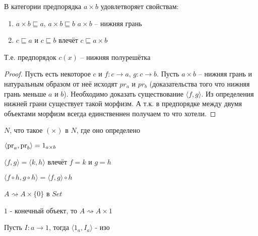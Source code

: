 \begin{task}
  В категории предпорядка
  $a \times b$ удовлетворяет свойствам:
  \begin{enumerate}
  \item $a \times b \sqsubseteq a$, $a \times b \sqsubseteq b$
      $a \times b$ -- нижняя грань
    \item $c \sqsubseteq a$ и $c \sqsubseteq b$ влечёт $c \sqsubseteq a \times b$
  \end{enumerate}
  Т.е. предпорядок $c (x)$ -- нижняя полурешётка
\end{task}
\begin{proof}
   Пусть есть некоторое $c$ и $f \colon c \to a$, $g \colon c \to b$.
   Пусть $a \times b$ -- нижняя грань и натуральным образом от неё исходят
   $pr_a$ и $pr_b$ (доказательства того что нижняя грань меньше $a$ и $b$).
   Необходимо доказать существование $\langle f, g \rangle$.
   Из определения нижней грани существует такой морфизм. А т.к. в предпорядке
   между двумя объектами морфизм всегда единственнен получаем то что хотели.
 \end{proof}

\begin{task}
  $N$, что такое $(\times)$ в $N$, где оно определено
\end{task}

\begin{task}
  $\langle \operatorname{pr}_a, \operatorname{pr}_b \rangle = 1_{a \times b}$
\end{task}

\begin{task}
  $\langle f, g \rangle = \langle k, h \rangle$ влечёт $f = k$ и $g = h$
\end{task}

\begin{task}
  $\langle f \circ h, g \circ h \rangle = \langle f, g \rangle \circ h$
\end{task}

\begin{task}
  $A \rightsquigarrow A \times \{0\}$ в $Set$
\end{task}

\begin{task}
  $1$ - конечный объект, то $A \rightsquigarrow A \times 1$
\end{task}

\begin{task}
  Пусть $I \colon a \to 1$, тогда $\langle 1_a, I_a \rangle$ - изо
\end{task}

